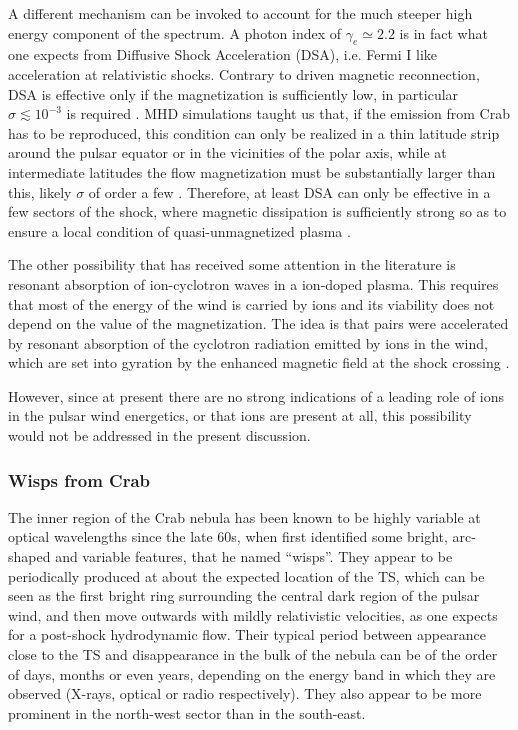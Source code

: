 
A different mechanism can be invoked to account for the much steeper high energy component of the spectrum. A photon index of $\gamma_e \simeq 2.2$ is in fact what one expects from Diffusive Shock Acceleration (DSA), i.e. Fermi I like acceleration at relativistic shocks. 
Contrary to driven magnetic reconnection, DSA is effective only if the magnetization is sufficiently low, in particular $\sigma \lesssim 10^{-3}$ is required \citep{Sironi:2009}. 
MHD simulations taught us that, if the emission from Crab has to be reproduced, this condition can only be realized in a thin latitude strip around the pulsar equator or in the vicinities of the polar axis, while at intermediate latitudes the flow magnetization must be substantially larger than this, likely $\sigma$ of order a few \citep{Komissarov:2013}. 
Therefore, at least DSA can only be effective in a few sectors of the shock, where magnetic dissipation is sufficiently strong so as to ensure a local condition of quasi-unmagnetized plasma \citep{Amato:2014}.

The other possibility that has received some attention in the literature is resonant absorption of ion-cyclotron waves in a ion-doped plasma. This requires that most of the energy of the wind is carried by ions and its viability does not depend on the value of the magnetization. 
The idea is that pairs were accelerated by resonant absorption of the cyclotron radiation emitted by ions in the wind, which are set into gyration by the enhanced magnetic field at the shock crossing \citep{Amato:2014}.

However, since at present there are no strong indications of a leading role of ions in the pulsar wind energetics, or that ions are present at all, this possibility would not be addressed in the present discussion.

\subsubsection{Wisps from Crab}

The inner region of the Crab nebula has been known to be highly variable at optical wavelengths since the late 60s, when \citet{Scargle:1969} first identified some bright, arc-shaped and variable features, that he named \enquote{wisps}. 
They appear to be periodically produced at about the expected location of the TS, which can be seen as the first bright ring surrounding the central dark region of the pulsar wind, and then move outwards with mildly relativistic velocities, as one expects for a post-shock hydrodynamic flow. 
Their typical period between appearance close to the TS and disappearance in the bulk of the nebula can be of the order of days, months or even years, depending on the energy band in which they are observed (X-rays, optical or radio respectively).
They also appear to be more prominent in the north-west sector than in the south-east.

